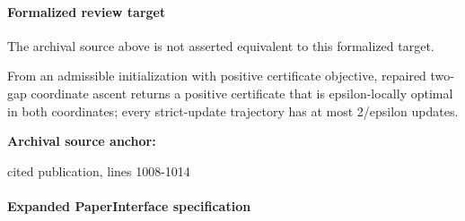 \documentclass[10pt]{article}
\begin{document}
\paragraph{Formalized review target}
The archival source above is not asserted equivalent to this formalized target.
\begin{ReviewVerbatim}
From an admissible initialization with positive certificate objective, repaired two-gap coordinate ascent returns a positive certificate that is epsilon-locally optimal in both coordinates; every strict-update trajectory has at most 2/epsilon updates.
\end{ReviewVerbatim}

\textbf{Archival source anchor:} {\footnotesize\raggedright cited publication, lines 1008-\allowbreak{}1014\par}
\paragraph{Expanded PaperInterface specification}
\end{document}
